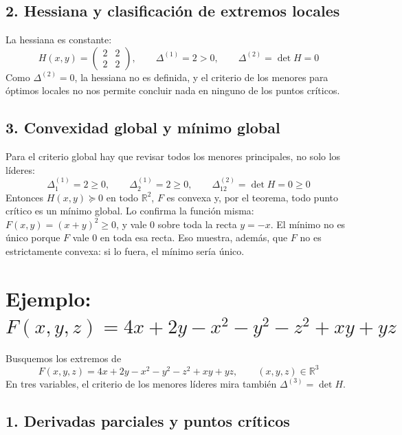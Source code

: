 \documentclass{article}
\newcommand{\R}{\ensuremath{\mathbb{R}}}
\begin{document}
\subsection*{2. Hessiana y clasificación de extremos locales}

La hessiana es constante:
\[
H(x,y)=\begin{pmatrix}2&2\\[4pt]2&2\end{pmatrix},
\qquad
\Delta^{(1)}=2>0,\qquad
\Delta^{(2)}=\det H=0
\]
Como \(\Delta^{(2)}=0\), la hessiana no es definida, y el criterio de los menores para óptimos locales no nos permite concluir nada en ninguno de los puntos críticos.

\subsection*{3. Convexidad global y mínimo global}

Para el criterio global hay que revisar todos los menores principales, no solo los líderes:
\[
\Delta^{(1)}_1=2\ge0,\qquad
\Delta^{(1)}_2=2\ge0,\qquad
\Delta^{(2)}_{12}=\det H=0\ge0
\]
Entonces \(H(x,y)\succeq 0\) en todo \(\R^2\), \(F\) es convexa y, por el teorema, todo punto crítico es un mínimo global. Lo confirma la función misma: \(F(x,y)=(x+y)^2\ge0\), y vale \(0\) sobre toda la recta \(y=-x\). El mínimo no es único porque \(F\) vale \(0\) en toda esa recta. Eso muestra, además, que \(F\) no es estrictamente convexa: si lo fuera, el mínimo sería único.

\medskip




\section*{Ejemplo: \(F(x,y,z)=4x+2y-x^2-y^2-z^2+xy+yz\)}

Busquemos los extremos de
\[
F(x,y,z)=4x+2y-x^2-y^2-z^2+xy+yz,\qquad (x,y,z)\in\R^3
\]
En tres variables, el criterio de los menores líderes mira también \(\Delta^{(3)}=\det H\).

\subsection*{1. Derivadas parciales y puntos críticos}
\end{document}
